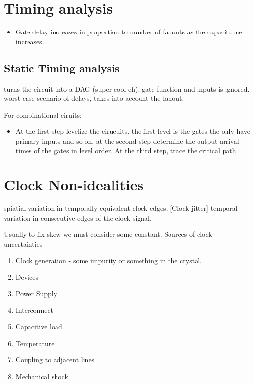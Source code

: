 \section{Timing analysis}
\begin{itemize}
    \item Gate delay increases in proportion to number of fanouts as the capacitance increases.
\end{itemize}
\subsection{Static Timing analysis}
turns the circuit into a DAG (super cool eh). gate function and inputs is ignored. worst-case scenario of delays, takes into account the fanout.

For combinational ciruits:
\begin{itemize}
    \item At the first step levelize the cirucuits. the first level is the gates the only have primary inputs and so on. at the second step determine the output arrival times of the gates in level order. At the third step, trace the critical path.
\end{itemize}

\section{Clock Non-idealities}
\begin{definition}
     spiatial variation in temporally equivalent clock edges.
        [Clock jitter] temporal variation in consecutive edges of the clock signal.
\end{definition}
Usually to fix skew we must consider some constant. Sources of clock uncertainties
\begin{enumerate}
    \item Clock generation - some impurity or something in the crystal.
    \item Devices
    \item Power Supply
    \item Interconnect
    \item Capacitive load
    \item Temperature
    \item Coupling to adjacent lines
    \item Mechanical shock
\end{enumerate}
